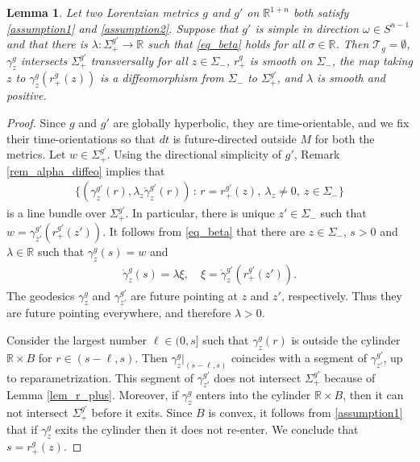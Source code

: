 \documentclass[11pt,letterpaper]{amsart}
\newtheorem{Lemma}[Theorem]{Lemma}
\theoremstyle{definition}
\numberwithin{equation}{section}
\def\R{\mathbb R}
\def\mid{\,:\,}
\begin{document}
\begin{Lemma}\label{lem_nontrapping}
Let two Lorentzian metrics $g$ and $g'$ on $\R^{1+n}$ both satisfy \eqref{assumption1} and \eqref{assumption2}. 
Suppose that $g'$ is simple in direction $\omega \in S^{n-1}$ and that there is $\lambda : \Sigma_+^{g'} \to \R$ such that \eqref{eq_beta} holds for all $\sigma \in \R$.
Then 
$\mathcal{T}_{g} = \emptyset$, $\gamma_z^{g}$ intersects $\Sigma_+^{g'}$ transversally for all $z \in \Sigma_-$,
$r_+^{g}$ is smooth on $\Sigma_-$, the map
taking $z$ to $\gamma_z^{g}(r_+^{g}(z))$ is a diffeomorphism from $\Sigma_{-}$ to $\Sigma_{+}^{g'}$, and $\lambda$ is smooth and positive.
\end{Lemma}
\begin{proof}
Since $g$ and $g'$ are globally hyperbolic, they are time-orientable, and we fix their time-orientations so that $dt$ is future-directed outside $M$ for both the metrics.
Let $w \in \Sigma_+^{g'}$.
Using the directional simplicity of $g'$, Remark \ref{rem_alpha_diffeo} implies that
    \begin{align}\label{def_line_bundle}
\{(\gamma_z^{g'}(r), \lambda_z \dot \gamma_z^{g'}(r)) \mid r=r_+^{g'}(z),\ \lambda_z \ne 0, \ z \in \Sigma_{-}\}
    \end{align}
is a line bundle over $\Sigma_{+}^{g'}$.
In particular, there is unique $z' \in \Sigma_-$ such that $w = \gamma_{z'}^{g'}(r_+^{g'}(z'))$. It follows from \eqref{eq_beta} that there
are $z \in \Sigma_{-}$, $s > 0$ and $\lambda \in \R$ such that $\gamma_z^{g}(s) = w$ and 
    \begin{align}\label{def_lambda}
\dot \gamma_z^{g}(s) = \lambda \xi, \quad \xi = \dot \gamma_z^{g'}(r_+^{g'}(z')).
    \end{align}
The geodesics $\gamma_z^{g}$ and $\gamma_{z'}^{g'}$ are future pointing at $z$ and $z'$, respectively. Thus they are future pointing everywhere, and therefore $\lambda > 0$. 

Consider the largest number $\ell \in (0, s]$ such that $\gamma_z^{g}(r)$ is outside the cylinder $\R \times B$ for $r \in (s-\ell, s)$. Then $\gamma_z^{g}|_{(s-\ell, s)}$ coincides with a segment of $\gamma_{z'}^{g'}$, up to reparametrization. This segment of $\gamma_{z'}^{g'}$ does not intersect $\Sigma_+^{g'}$ because of Lemma \ref{lem_r_plus}. Moreover, if $\gamma_z^{g}$ enters into the cylinder $\R \times B$, then it can not intersect $\Sigma_+^{g'}$ before it exits. Since $B$ is convex, it follows from \eqref{assumption1} that if $\gamma_z^g$ exits the cylinder then it does not re-enter. We conclude that $s = r_+^{g}(z)$.


\end{proof}
\end{document}
